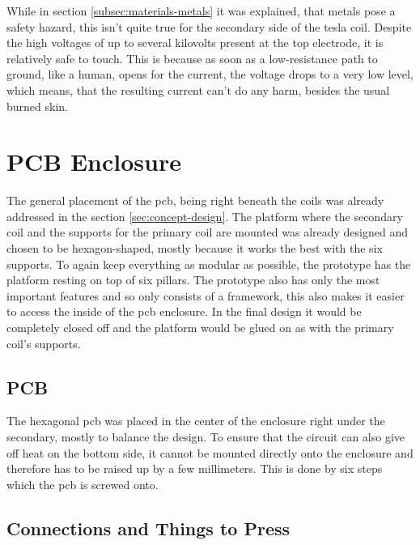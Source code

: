While in section \ref{subsec:materials-metals} it was explained, that metals pose a safety hazard, this isn't quite true for the secondary side of the tesla coil. Despite the high voltages of up to several kilovolts present at the top electrode, it is relatively safe to touch. This is because as soon as a low-resistance path to ground, like a human, opens for the current, the voltage drops to a very low level, which means, that the resulting current can't do any harm, besides the usual burned skin.

\section{PCB Enclosure}

The general placement of the \gls{pcb}, being right beneath the coils was already addressed in the section \ref{sec:concept-design}. The platform where the secondary coil and the supports for the primary coil are mounted was already designed and chosen to be hexagon-shaped, mostly because it works the best with the six supports. To again keep everything as modular as possible, the prototype has the platform resting on top of six pillars. The prototype also has only the most important features and so only consists of a framework, this also makes it easier to access the inside of the \gls{pcb} enclosure. In the final design it would be completely closed off and the platform would be glued on as with the primary coil's supports.

\subsection{PCB}

The hexagonal \gls{pcb} was placed in the center of the enclosure right under the secondary, mostly to balance the design. To ensure that the circuit can also give off heat on the bottom side, it cannot be mounted directly onto the enclosure and therefore has to be raised up by a few millimeters. This is done by six steps which the \gls{pcb} is screwed onto. 

\subsection{Connections and Things to Press}


